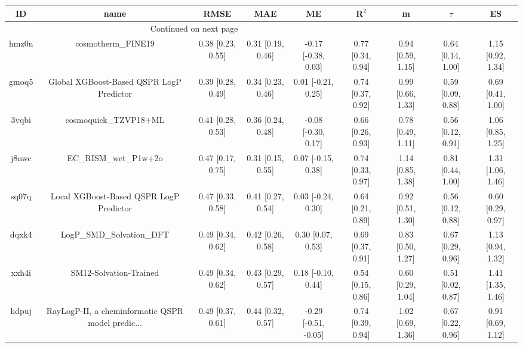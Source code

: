 \documentclass{article}
\begin{document}
\begin{center}
\scriptsize
\begin{longtable}{|ccccccccc|}
\toprule
    ID &                                               name &               RMSE &                MAE &                    ME &              R$^2$ &                    m &               $\tau$ &                    ES \\
\midrule
\endhead
\midrule
\multicolumn{3}{r}{{Continued on next page}} \\
\midrule
\endfoot

\bottomrule
\endlastfoot
 hmz0n &                                 cosmotherm\_FINE19 &  0.38 [0.23, 0.55] &  0.31 [0.19, 0.46] &   -0.17 [-0.38, 0.03] &  0.77 [0.34, 0.94] &    0.94 [0.59, 1.15] &    0.64 [0.14, 1.00] &     1.15 [0.92, 1.34] \\
 gmoq5 &           Global XGBoost-Based QSPR LogP Predictor &  0.39 [0.28, 0.49] &  0.34 [0.23, 0.46] &    0.01 [-0.21, 0.25] &  0.74 [0.37, 0.92] &    0.99 [0.66, 1.33] &    0.59 [0.09, 0.88] &     0.69 [0.41, 1.00] \\
 3vqbi &                              cosmoquick\_TZVP18+ML &  0.41 [0.28, 0.53] &  0.36 [0.24, 0.48] &   -0.08 [-0.30, 0.17] &  0.66 [0.26, 0.93] &    0.78 [0.49, 1.11] &    0.56 [0.12, 0.91] &     1.06 [0.85, 1.25] \\
 j8nwc &                              EC\_RISM\_wet\_P1w+2o &  0.47 [0.17, 0.75] &  0.31 [0.15, 0.55] &    0.07 [-0.15, 0.38] &  0.74 [0.33, 0.97] &    1.14 [0.85, 1.38] &    0.81 [0.44, 1.00] &     1.31 [1.06, 1.46] \\
 sq07q &            Local XGBoost-Based QSPR LogP Predictor &  0.47 [0.33, 0.58] &  0.41 [0.27, 0.54] &    0.03 [-0.24, 0.30] &  0.64 [0.21, 0.89] &    0.92 [0.51, 1.30] &    0.56 [0.12, 0.88] &     0.60 [0.29, 0.97] \\
 dqxk4 &                          LogP\_SMD\_Solvation\_DFT &  0.49 [0.34, 0.62] &  0.42 [0.26, 0.58] &     0.30 [0.07, 0.53] &  0.69 [0.37, 0.91] &    0.83 [0.50, 1.27] &    0.67 [0.29, 0.96] &     1.13 [0.94, 1.32] \\
 xxh4i &                             SM12-Solvation-Trained &  0.49 [0.34, 0.62] &  0.43 [0.29, 0.57] &    0.18 [-0.10, 0.44] &  0.54 [0.15, 0.86] &    0.60 [0.29, 1.04] &    0.51 [0.02, 0.87] &     1.41 [1.35, 1.46] \\
 hdpuj &  RayLogP-II, a cheminformatic QSPR model predic... &  0.49 [0.37, 0.61] &  0.44 [0.32, 0.57] &  -0.29 [-0.51, -0.05] &  0.74 [0.39, 0.94] &    1.02 [0.69, 1.36] &    0.67 [0.22, 0.96] &     0.91 [0.69, 1.12] \\

\end{longtable}
\end{center}
\end{document}
